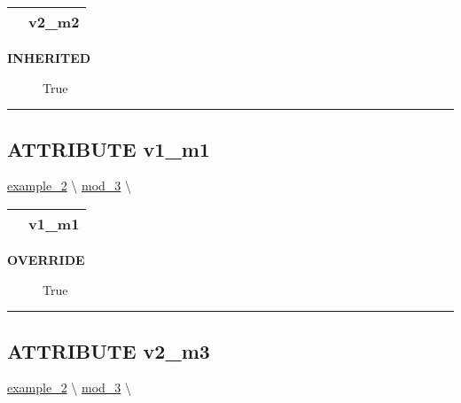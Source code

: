 {\renewcommand{\arraystretch}{1.5}
\begin{tabularx}{\textwidth}{|>{\raggedright\arraybackslash}l|X|}
\hline
\hspace{0pt}\mytexttt{\color{red} } & \textbf{v2\_m2} \\
\hline
\end{tabularx}
}

\par

\par
\begin{description}
\item [\colorbox{tagtype}{\color{white} \textbf{\textsf{INHERITED}}}] \textbf{\underline{}} True
\end{description}

\rule{\linewidth}{0.5pt}
\subsection*{\textsf{\colorbox{headtoc}{\color{white} ATTRIBUTE}
v1\_m1}}

\hypertarget{ecldoc:intest.example_2.mod_3.v1_m1}{}
\hspace{0pt} \hyperlink{ecldoc:intest.example_2}{example_2} \textbackslash 
\hspace{0pt} \hyperlink{ecldoc:intest.example_2.mod_3}{mod_3} \textbackslash 

{\renewcommand{\arraystretch}{1.5}
\begin{tabularx}{\textwidth}{|>{\raggedright\arraybackslash}l|X|}
\hline
\hspace{0pt}\mytexttt{\color{red} } & \textbf{v1\_m1} \\
\hline
\end{tabularx}
}

\par

\par
\begin{description}
\item [\colorbox{tagtype}{\color{white} \textbf{\textsf{OVERRIDE}}}] \textbf{\underline{}} True
\end{description}

\rule{\linewidth}{0.5pt}
\subsection*{\textsf{\colorbox{headtoc}{\color{white} ATTRIBUTE}
v2\_m3}}

\hypertarget{ecldoc:intest.example_2.mod_3.v2_m3}{}
\hspace{0pt} \hyperlink{ecldoc:intest.example_2}{example_2} \textbackslash 
\hspace{0pt} \hyperlink{ecldoc:intest.example_2.mod_3}{mod_3} \textbackslash 

